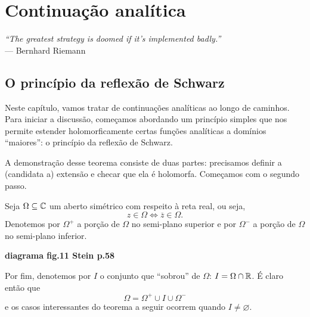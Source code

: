 \chapter[Continuação analítica]{Continuação analítica}
\chaptermark{}

\hfill%
\begin{minipage}{10cm}
    \begin{flushright}
    \rightskip=0.5cm
        \textit{``The greatest strategy is doomed if it's implemented badly.''}
        \\[0.1cm]
    \rightskip=0.5cm
    --- Bernhard Riemann
    \end{flushright}
\end{minipage}

\section{O princípio da reflexão de Schwarz} %
\label{sec:Schwarz} %
    Neste capítulo, vamos tratar de continuações analíticas ao longo de caminhos.
    Para iniciar a discussão, começamos abordando um princípio simples que nos permite
    estender holomorficamente certas funções analíticas a domínios ``maiores'': 
    o princípio da reflexão de Schwarz.
    
    A demonstração desse teorema consiste de duas partes: precisamos definir a 
    (candidata a) extensão e checar que ela é holomorfa. Começamos com o segundo passo.
    
    Seja $\Omega\subseteq\mathbb{C}$ um aberto simétrico com respeito à reta real, ou seja,
    \begin{equation*}
        z\in\Omega \iff \overline{z}\in\Omega.
    \end{equation*}
    Denotemos por 
    $\Omega^+$ a porção de $\Omega$ no semi-plano superior e por 
    $\Omega^-$ a porção de $\Omega$ no semi-plano inferior.
    \begin{center}
        \textbf{diagrama fig.11 Stein p.58}
    \end{center}
    Por fim, denotemos por $I$ o conjunto que ``sobrou'' de $\Omega$: 
    $I = \Omega\cap\mathbb{R}$. É claro então que
    \begin{equation*}
        \Omega = \Omega^+ \cup I \cup \Omega^-
    \end{equation*}
    e os casos interessantes do teorema a seguir ocorrem quando $I\neq\varnothing$.
    
